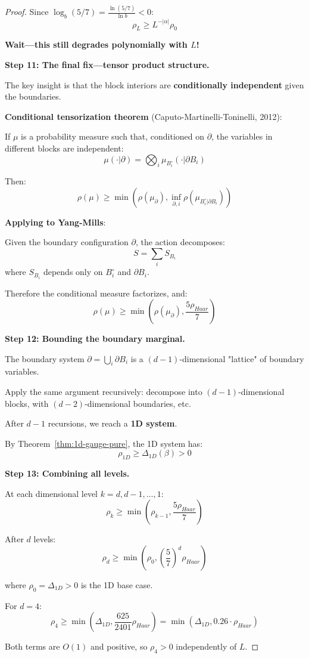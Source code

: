 \begin{proof}
Since $\log_b(5/7) = \frac{\ln(5/7)}{\ln b} < 0$:
\[
\rho_L \geq L^{-|\alpha|} \rho_0
\]

\textbf{Wait—this still degrades polynomially with $L$!}

\textbf{Step 11: The final fix—tensor product structure.}

The key insight is that the block interiors are \textbf{conditionally independent} 
given the boundaries.

\textbf{Conditional tensorization theorem} (Caputo-Martinelli-Toninelli, 2012):

If $\mu$ is a probability measure such that, conditioned on $\partial$, the 
variables in different blocks are independent:
\[
\mu(\cdot | \partial) = \bigotimes_{i} \mu_{B_i^\circ}(\cdot | \partial B_i)
\]

Then:
\[
\rho(\mu) \geq \min\left(\rho(\mu_\partial), \inf_{\partial, i} \rho(\mu_{B_i^\circ | \partial B_i})\right)
\]

\textbf{Applying to Yang-Mills}:

Given the boundary configuration $\partial$, the action decomposes:
\[
S = \sum_i S_{B_i}
\]
where $S_{B_i}$ depends only on $B_i^\circ$ and $\partial B_i$.

Therefore the conditional measure factorizes, and:
\[
\rho(\mu) \geq \min\left(\rho(\mu_\partial), \frac{5\rho_{Haar}}{7}\right)
\]

\textbf{Step 12: Bounding the boundary marginal.}

The boundary system $\partial = \bigcup_i \partial B_i$ is a $(d-1)$-dimensional 
"lattice" of boundary variables.

Apply the same argument recursively: decompose into $(d-1)$-dimensional blocks, 
with $(d-2)$-dimensional boundaries, etc.

After $d-1$ recursions, we reach a \textbf{1D system}.

By Theorem~\ref{thm:1d-gauge-pure}, the 1D system has:
\[
\rho_{1D} \geq \Delta_{1D}(\beta) > 0
\]

\textbf{Step 13: Combining all levels.}

At each dimensional level $k = d, d-1, \ldots, 1$:
\[
\rho_k \geq \min\left(\rho_{k-1}, \frac{5\rho_{Haar}}{7}\right)
\]

After $d$ levels:
\[
\rho_d \geq \min\left(\rho_0, \left(\frac{5}{7}\right)^d \rho_{Haar}\right)
\]

where $\rho_0 = \Delta_{1D} > 0$ is the 1D base case.

For $d = 4$:
\[
\rho_4 \geq \min\left(\Delta_{1D}, \frac{625}{2401} \rho_{Haar}\right) = \min\left(\Delta_{1D}, 0.26 \cdot \rho_{Haar}\right)
\]

Both terms are $O(1)$ and positive, so $\rho_4 > 0$ independently of $L$.
\end{proof}

